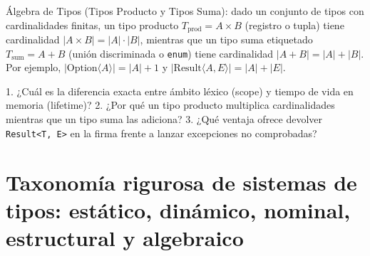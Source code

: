 \documentclass{book}
\begin{document}
\begin{tcolorbox}[title={Definición}, studiumdef, breakable]

Álgebra de Tipos (Tipos Producto y Tipos Suma): dado un conjunto de tipos con cardinalidades finitas, un tipo producto \(T_{\text{prod}} = A \times B\) (registro o tupla) tiene cardinalidad \(|A \times B| = |A| \cdot |B|\), mientras que un tipo suma etiquetado \(T_{\text{sum}} = A + B\) (unión discriminada o \texttt{enum}) tiene cardinalidad \(|A + B| = |A| + |B|\). Por ejemplo, \(|\text{Option}\langle A \rangle| = |A| + 1\) y \(|\text{Result}\langle A, E \rangle| = |A| + |E|\).
\end{tcolorbox}

\begin{tcolorbox}[title={Autoficha}, studiumcheck, breakable]

1. ¿Cuál es la diferencia exacta entre ámbito léxico (scope) y tiempo de vida en memoria (lifetime)? 2. ¿Por qué un tipo producto multiplica cardinalidades mientras que un tipo suma las adiciona? 3. ¿Qué ventaja ofrece devolver \texttt{Result<T, E>} en la firma frente a lanzar excepciones no comprobadas?
\end{tcolorbox}

\section{Taxonomía rigurosa de sistemas de tipos: estático, dinámico, nominal, estructural y algebraico}
\end{document}
